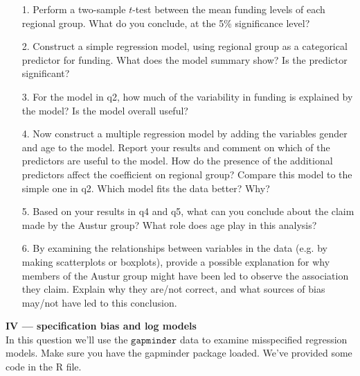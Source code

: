 \documentclass[10pt]{extarticle}
\begin{document}
\begin{itemize}

    \item[1.] Perform a two-sample $t$-test between the mean funding levels of each regional group. What do you conclude, at the 5\% significance level? \\ 
    
    \item[2.] Construct a simple regression model, using regional group as a categorical predictor for funding. What does the model summary show? Is the predictor significant? \\ 
    
    \item[3.] For the model in q2, how much of the variability in funding is explained by the model? Is the model overall useful?  \\ 
    
    \item[4.] Now construct a multiple regression model by adding the variables gender and age to the model. Report your results and comment on which of the predictors are useful to the model. How do the presence of the additional predictors affect the coefficient on regional group? Compare this model to the simple one in q2. Which model fits the data better? Why? \\ 
    
    \item[5.] Based on your results in q4 and q5, what can you conclude about the claim made by the Austur group? What role does age play in this analysis? \\ 
    
    \item[6.] By examining the relationships between variables in the data (e.g. by making scatterplots or boxplots), provide a possible explanation for why members of the Austur group might have been led to observe the association they claim. Explain why they are/not correct, and what sources of bias may/not have led to this conclusion. 
    
\end{itemize}




\hfill 

{\Large \bf IV --- specification bias and log models}  \\

In this question we'll use the $\texttt{gapminder}$ data to examine misspecified regression models. Make sure you have the gapminder package loaded. We've provided some code in the R file. \\ 
\end{document}
